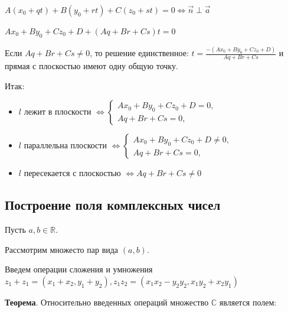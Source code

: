 \documentclass[a4paper]{article}
\begin{document}
\begin{hproof}
$A(x_0 + qt) + B(y_0 + rt) + C(z_0 + st) = 0 \Leftrightarrow \vec{n} \perp \vec{a}$

$Ax_0 + By_0 + Cz_0 + D + (Aq+Br+Cs)t=0$

Если $Aq+Br+Cs \neq 0$, то решение единственное: $\displaystyle t = \frac{-(Ax_0 + By_0 + Cz_0 + D)}{Aq+Br+Cs}$ и прямая с плоскостью имеют одну общую точку.
\end{hproof}

Итак: \begin{itemize}
\item $l$ лежит в плоскости $\Leftrightarrow \begin{cases}
Ax_0 + By_0 + Cz_0 + D = 0,
\\
Aq+Br+Cs=0,
\end{cases}$
\item $l$ параллельна плоскости $\Leftrightarrow \begin{cases}
Ax_0 + By_0 + Cz_0 + D \neq 0,
\\
Aq+Br+Cs=0,
\end{cases}$
\item $l$ пересекается с плоскостью $\Leftrightarrow Aq+Br+Cs\neq 0$
\end{itemize}


\newpage \begin{center}\begin{Large}\end{Large}\end{center}
\subsection*{Построение поля комплексных чисел}
Пусть $a,b \in \mathbb{R}$.

Рассмотрим множесто пар вида $(a,b)$.

Введем операции сложения и умножения $z_1 + z_1 = (x_1+x_2,y_1+y_2), z_1 z_2 = (x_1 x_2 -y_2 y_2, x_1 y_2 + x_2 y_1)$

\begin{htheorem}
\textbf{Теорема}. Относительно введенных операций множество $\mathbb{C}$ является полем:
\end{htheorem}
\end{document}
